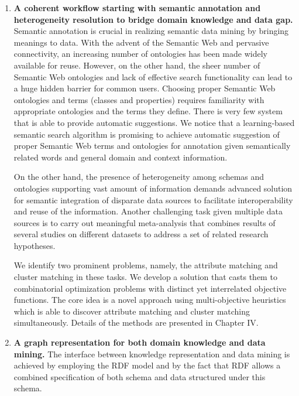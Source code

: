 \begin{enumerate}
\item \textbf{A coherent workflow starting with semantic annotation and heterogeneity resolution to bridge domain knowledge and data gap.}
    Semantic annotation is crucial in realizing semantic data mining by bringing meanings to data. With the advent of the Semantic Web and pervasive connectivity, an increasing number of ontologies has been made widely available for reuse. However, on the other hand, the sheer number of Semantic Web ontologies and lack of effective search functionality can lead to a huge hidden barrier for common users. Choosing proper Semantic Web ontologies and terms (classes and properties) requires familiarity with appropriate ontologies and the terms they define. There is very few system that is able to provide automatic suggestions. We notice that a learning-based semantic search algorithm is promising to achieve automatic suggestion of proper Semantic Web terms and ontologies for annotation given semantically related words and general domain and context information.
    
    On the other hand, the presence of heterogeneity among schemas and ontologies supporting vast amount of information demands advanced solution for semantic integration of disparate data sources to facilitate interoperability and reuse of the information. Another challenging task given multiple data sources is to carry out meaningful meta-analysis that combines results of several studies on different datasets to address a set of related research hypotheses.
    
    We identify two prominent problems, namely, the attribute matching and cluster matching in these tasks. We develop a solution that casts them to combinatorial optimization problems with distinct yet interrelated objective functions. The core idea is a novel approach using multi-objective heuristics which is able to discover attribute matching and cluster matching simultaneously. Details of the methods are presented in Chapter IV.
    

\item \textbf{A graph representation for both domain knowledge and data mining.}
    The interface between knowledge representation and data mining is achieved by employing the RDF model and by the fact that RDF allows a combined specification of both schema and data structured under this schema.


\end{enumerate}
